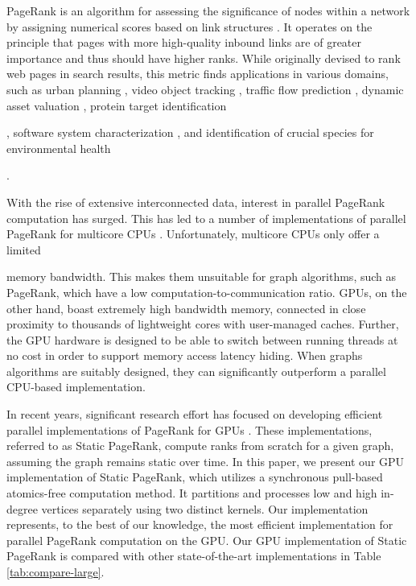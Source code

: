 PageRank is an algorithm for assessing the significance of nodes within a network by assigning numerical scores based on link structures \cite{rank-page99}. It operates on the principle that pages with more high-quality inbound links are of greater importance and thus should have higher ranks. While originally devised to rank web pages in search results, this metric finds applications in various domains, such as urban planning \cite{urban-zhang18}, video object tracking \cite{gong2013pagerank}, traffic flow prediction \cite{traffic-kim15}, dynamic asset valuation \cite{sawilla2006abstracting}, protein target identification \cite{banky2013equal}, software system characterization \cite{chepelianskii2010towards}, and identification of crucial species for environmental health \cite{allesina2009googling}.

With the rise of extensive interconnected data, interest in parallel PageRank computation has surged. This has led to a number of implementations of parallel PageRank for multicore CPUs \cite{rank-garg16, rank-beamer17, rank-lakhotia18, grutzmacher2020acceleration, huang2020accelerating, chen2021hipa}. Unfortunately, multicore CPUs only offer a limited memory bandwidth. This makes them unsuitable for graph algorithms, such as PageRank, which have a low computation-to-communication ratio. GPUs, on the other hand, boast extremely high bandwidth memory, connected in close proximity to thousands of lightweight cores with user-managed caches. Further, the GPU hardware is designed to be able to switch between running threads at no cost in order to support memory access latency hiding. When graphs algorithms are suitably designed, they can significantly outperform a parallel CPU-based implementation.

In recent years, significant research effort has focused on developing efficient parallel implementations of PageRank for GPUs \cite{duong2012parallel, rank-nvgraph, wang2016gunrock, busato2018hornet, dathathri2018gluon, nodehi2018tigr, grutzmacher2018high, piccinotti2019solving, grutzmacher2020acceleration, kang2020computing, wang2021grus, chen2022atos, chen2022scalable, yang2022graphblast, concessao2023meerkat}. These implementations, referred to as Static PageRank, compute ranks from scratch for a given graph, assuming the graph remains static over time. In this paper, we present our GPU implementation of Static PageRank, which utilizes a synchronous pull-based atomics-free computation method. It partitions and processes low and high in-degree vertices separately using two distinct kernels. Our implementation represents, to the best of our knowledge, the most efficient implementation for parallel PageRank computation on the GPU. Our GPU implementation of Static PageRank is compared with other state-of-the-art implementations in Table \ref{tab:compare-large}.

